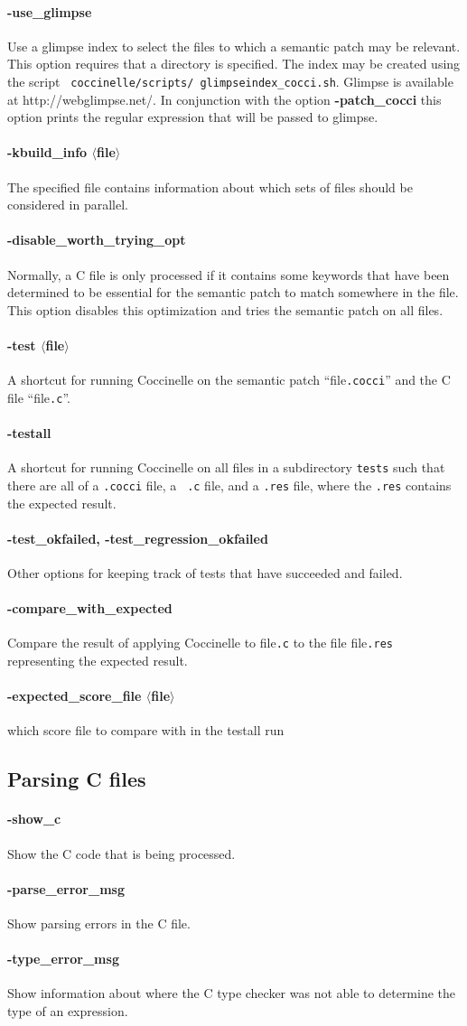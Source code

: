 \documentclass{article}
\newcommand{\normal}[2]{\paragraph*{\makebox[0in][r]{\BigLowerDiamond\,\,} {{#1}}} {#2}}
\newcommand{\rare}[2]{\paragraph*{\makebox[0in][r]{\BigDiamondshape\,\,} {{#1}}} {#2}}
\newcommand{\developer}[2]{\paragraph*{{#1}} {#2}}
\begin{document}
\normal{-use\_glimpse}{ Use a glimpse index to select the files to which
a semantic patch may be relevant.  This option requires that a directory is
specified.  The index may be created using the script {\tt
  coccinelle/scripts/ glimpseindex\_cocci.sh}.  Glimpse is available at
http://webglimpse.net/.  In conjunction with the option {\bf -patch\_cocci}
this option prints the regular expression that will be passed to glimpse.}

\developer{-kbuild\_info $\langle$file$\rangle$}{ The specified file
  contains information about which sets of files should be considered in
  parallel.}

\developer{-disable\_worth\_trying\_opt}{Normally, a C file is only
  processed if it contains some keywords that have been determined to be
  essential for the semantic patch to match somewhere in the file.  This
  option disables this optimization and tries the semantic patch on all files.}

\developer{-test $\langle$file$\rangle$}{ A shortcut for running Coccinelle
on the semantic patch ``file{\tt{.cocci}}'' and the C file ``file{\tt{.c}}''.}

\developer{-testall}{A shortcut for running Coccinelle on all files in a
  subdirectory {\tt tests} such that there are all of a {\tt .cocci} file, a {\tt
    .c} file, and a {\tt .res} file, where the {\tt .res} contains the
  expected result.}

\developer{-test\_okfailed, -test\_regression\_okfailed} Other options for
keeping track of tests that have succeeded and failed.

\developer{-compare\_with\_expected}{Compare the result of applying
  Coccinelle to file{\tt{.c}} to the file file{\tt{.res}} representing the
  expected result.}

\developer{-expected\_score\_file $\langle$file$\rangle$}{
which score file to compare with in the testall run}

\subsection{Parsing C files}

\rare{-show\_c}{Show the C code that is being processed.}

\rare{-parse\_error\_msg}{Show parsing errors in the C file.}

\rare{-type\_error\_msg}{Show information about where the C type checker
  was not able to determine the type of an expression.}
\end{document}
